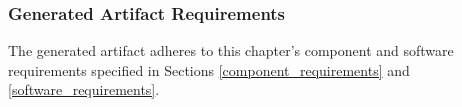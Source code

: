 \subsubsection{Generated Artifact Requirements} \label{generated_artifact_requirements}

The generated artifact adheres to this chapter's component and software requirements
specified in Sections \ref{component_requirements} and \ref{software_requirements}.
